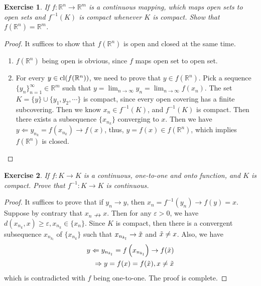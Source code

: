 \documentclass[12pt,leqno]{amsart}
\newtheorem{exercise}{Exercise}[section]
\theoremstyle{definition}
\numberwithin{equation}{subsection}
\begin{document}
\begin{exercise}
If $f:\mathbb{R}^n\to\mathbb{R}^m$ is a continuous mapping, which maps open sets to open sets and $f^{-1}(K)$ is compact whenever $K$ is compact. Show that $f(\mathbb{R}^n) = \mathbb{R}^m$.
\end{exercise}
\begin{proof}
It suffices to show that $f(\mathbb{R}^n)$ is open and closed at the same time. 
\begin{enumerate}
    \item $f(\mathbb{R}^n)$ being open is obvious, since $f$ maps open set to open set.
    \item For every $y\in{\rm cl}(f(\mathbb{R}^n))$, we need to prove that $y\in f(\mathbb{R}^n)$. Pick a sequence $\{y_n\}^\infty_{n = 1}\in \mathbb{R}^m$ such that $y = \lim_{n\to\infty}y_n = \lim_{n\to\infty} f(x_n)$. The set $K = \{y\}\cup \{y_1, y_2, \cdots\}$ is compact, since every open covering has a finite subcovering. Then we know $x_n\in f^{-1}(K)$, and $f^{-1}(K)$ is compact. Then there exists a subsequence $\{x_{n_k}\}$ converging to $x$. Then we have $y\Leftarrow y_{n_k} = f(x_{n_k}) \to f(x)$, thus, $y = f(x)\in f(\mathbb{R}^n)$, which implies $f(\mathbb{R}^n)$ is closed.
\end{enumerate}
\end{proof}

\medskip

\begin{exercise}
If $f:K\to K$ is a continuous, one-to-one and onto function, and $K$ is compact. Prove that $f^{-1}:K\to K$ is continuous.
\end{exercise}
\begin{proof}
It suffices to prove that if $y_n\to y$, then $x_n = f^{-1}(y_n)\to f(y) = x$. Suppose by contrary that $x_n \nrightarrow x$. Then for any $\varepsilon > 0$, we have $d\left(x_{n_k}, x\right)\geq \varepsilon, x_{n_k}\in\{x_n\}$. Since $K$ is compact, then there is a convergent subsequence $x_{n_{k_l}}$ of $\{x_{n_k}\}$ such that $x_{n_{k_l}}\to\Tilde{x}$ and $\Tilde{x}\neq x$. Also, we have 
\begin{align*}
    y \Leftarrow y_{n_{k_l}} = f\left(x_{n_{k_l}}\right) \to f(\Tilde{x}) \\
    \Rightarrow y = f(x) = f(\Tilde{x}), x \neq \Tilde{x}
\end{align*}
which is contradicted with $f$ being one-to-one. The proof is complete. 
\end{proof}

\medskip
\end{document}
